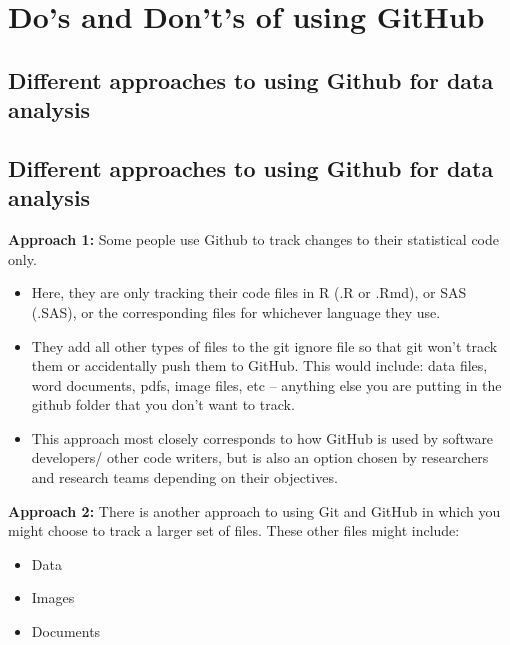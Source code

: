 \documentclass[
]{book}
\providecommand{\tightlist}{%
  \setlength{\itemsep}{0pt}\setlength{\parskip}{0pt}}
\begin{document}
\hypertarget{dos-and-donts-of-using-github}{%
\chapter{Do's and Don't's of using GitHub}\label{dos-and-donts-of-using-github}}

\hypertarget{different-approaches-to-using-github-for-data-analysis}{%
\section{Different approaches to using Github for data analysis}\label{different-approaches-to-using-github-for-data-analysis}}

\hypertarget{different-approaches-to-using-github-for-data-analysis-1}{%
\section{Different approaches to using Github for data analysis}\label{different-approaches-to-using-github-for-data-analysis-1}}

\textbf{Approach 1:} Some people use Github to track changes to their statistical code
only.

\begin{itemize}
\tightlist
\item
  Here, they are only tracking their code files in R (.R or .Rmd), or
  SAS (.SAS), or the corresponding files for whichever language they use.
\item
  They add all other types of files to the git ignore file so that git
  won't track them or accidentally push them to GitHub. This would include:
  data files, word documents, pdfs, image files, etc -- anything else you are
  putting in the github folder that you don't want to track.
\item
  This approach most closely corresponds to how GitHub is used by software developers/
  other code writers, but is also an option chosen by researchers and research
  teams depending on their objectives.
\end{itemize}

\textbf{Approach 2:} There is another approach to using Git and GitHub in which you
might choose to track a larger set of files. These other files might include:

\begin{itemize}
\tightlist
\item
  Data
\item
  Images
\item
  Documents
\end{itemize}
\end{document}
